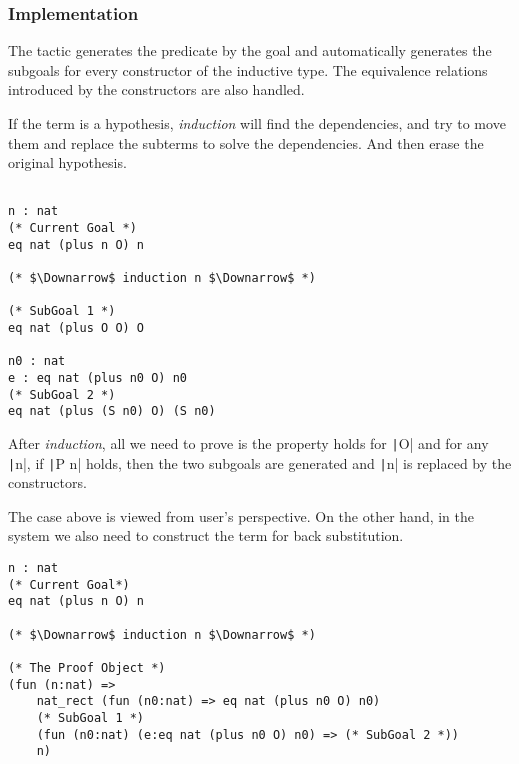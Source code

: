 \subsubsection*{Implementation}

The tactic generates the predicate by the goal and automatically generates 
the subgoals for every constructor of the inductive type.
The equivalence relations introduced by the constructors are also handled.

If the term is a hypothesis, {\it induction} will find the dependencies, 
and try to move them and replace the subterms to solve the dependencies.
And then erase the original hypothesis.

\begin{center}
\begin{minipage}{0.7\textwidth}
\begin{verbatim}
                                                                   
n : nat                                                            
(* Current Goal *)   
eq nat (plus n O) n                       

(* $\Downarrow$ induction n $\Downarrow$ *)

(* SubGoal 1 *)    
eq nat (plus O O) O

n0 : nat                     
e : eq nat (plus n0 O) n0    
(* SubGoal 2 *)              
eq nat (plus (S n0) O) (S n0)
\end{verbatim}
\end{minipage}
\end{center}

After {\it induction}, all we need to prove is the property holds for \texttt|O| and 
for any \texttt|n|, if \texttt|P n| holds,
then the two subgoals are generated and \texttt|n| is replaced by the constructors.

The case above is viewed from user's perspective.
On the other hand, in the system we also need to construct the term for back substitution.
\begin{center}
\begin{minipage}{\textwidth}
\begin{verbatim}
n : nat                               
(* Current Goal*)                              
eq nat (plus n O) n                             

(* $\Downarrow$ induction n $\Downarrow$ *)   

(* The Proof Object *)
(fun (n:nat) =>   
    nat_rect (fun (n0:nat) => eq nat (plus n0 O) n0)
    (* SubGoal 1 *)
    (fun (n0:nat) (e:eq nat (plus n0 O) n0) => (* SubGoal 2 *))
    n)                                                      
\end{verbatim}
\end{minipage}
\end{center}

